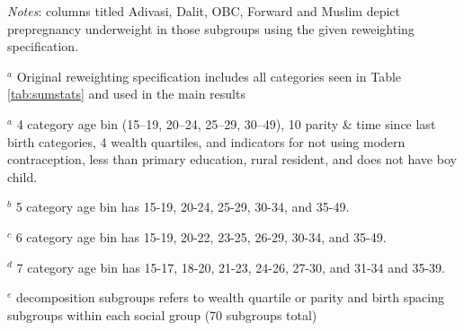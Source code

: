 \documentclass[12pt]{article}
\begin{document}
\begin{landscape}
    


\begin{table}[H]
    \centering

    \begin{threeparttable}
            
    \caption{: Prepregnancy underweight and diagnostics from different reweighting specifications}
    \label{specifications}
    \renewcommand{\arraystretch}{1.5}
    \scriptsize
    \setlength{\tabcolsep}{5pt}
    \resizebox{\textwidth}{!}{%
        
    }
    
    \scriptsize

    
    \begin{tablenotes}
        \item  \textit{Notes}: columns titled Adivasi, Dalit, OBC, Forward and Muslim depict  prepregnancy underweight in those subgroups using the given reweighting specification.
        \item $^a$ Original reweighting specification includes all categories seen in Table \ref{tab:sumstats} and used in the main results
        \item $^a$ 4 category age bin (15–19, 20–24, 25–29, 30–49), 10 parity \& time since last birth categories, 4 wealth quartiles, and indicators for not using modern contraception, less than primary education, rural resident, and does not have boy child.
        \item $^b$ 5 category age bin has 15-19, 20-24, 25-29, 30-34, and 35-49.
        \item $^c$ 6 category age bin has 15-19, 20-22, 23-25, 26-29, 30-34, and 35-49.
        \item $^d$ 7 category age bin has 15-17, 18-20, 21-23, 24-26, 27-30, and 31-34 and 35-39.
        \item $^e$ decomposition subgroups refers to wealth quartile or parity and birth spacing subgroups within each social group (70 subgroups total)

        
    \end{tablenotes}

    
    
    \end{threeparttable}
\end{table}


\end{landscape}
\end{document}
